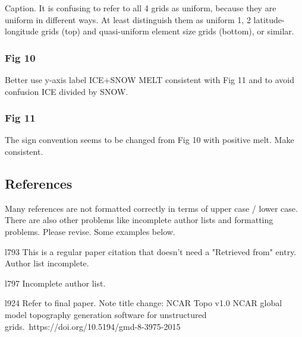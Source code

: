 \documentclass[12pt,oneside,a4paper]{article}%
\begin{document}
{\color{blue}{We have decided to keep the original polar projection, in order to show the polar points and Greenland.}} \newline

Caption. It is confusing to refer to all 4 grids as uniform, because they are uniform in different ways. At least distinguish them as uniform 1, 2 latitude-longitude grids (top) and quasi-uniform element size grids (bottom), or similar. \newline

{\color{blue}{Changed to new labeling discussed above.}}

\subsubsection*{Fig 10}
Better use y-axis label ICE+SNOW MELT consistent with Fig 11 and to avoid confusion ICE divided by SNOW. \newline

{\color{blue}{Done.}} \newline

\subsubsection*{Fig 11}
The sign convention seems to be changed from Fig 10 with positive melt. Make consistent. \newline

{\color{blue}{Done.}} \newline

\subsection*{References}

Many references are not formatted correctly in terms of upper case / lower case. There are also other problems like incomplete author lists and formatting problems. Please revise. Some examples below. \newline

l793 This is a regular paper citation that doesn't need a "Retrieved from" entry. Author list incomplete. \newline

{\color{blue}{Done.}} \newline

l797 Incomplete author list. \newline

l924 Refer to final paper. Note title change: NCAR Topo v1.0 NCAR global model topography generation software for unstructured grids. https://doi.org/10.5194/gmd-8-3975-2015 \newline
\end{document}
